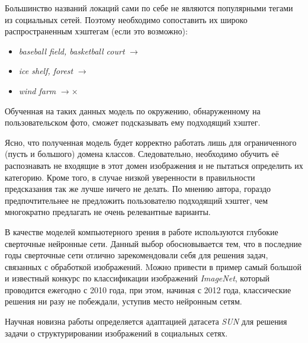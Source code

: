 \indent
Большинство названий локаций сами по себе не являются популярными 
тегами из социальных сетей. Поэтому необходимо
сопоставить их широко распространенным хэштегам (если это возможно):
  
  \begin{itemize}
      \item \textit{baseball field, basketball court}  $\rightarrow$ 
      \item \textit{ice shelf, forest} $\rightarrow$ 
      \item \textit{wind farm} $\rightarrow \times$ 
  \end{itemize}
  
\indent
Обученная на таких данных модель по окружению,
обнаруженному на пользовательском фото,
сможет подсказывать ему подходящий хэштег.



\indent
\indent
Ясно, что полученная модель будет корректно работать лишь для
ограниченного (пусть и большого) домена классов. Следовательно, необходимо 
обучить её распознавать не входящие в этот домен изображения и
не пытаться определить их категорию. Кроме того, в случае низкой уверенности
в правильности предсказания так же лучше ничего не делать. 
По мнению автора, гораздо предпочтительнее не 
предложить пользователю подходящий хэштег, чем многократно предлагать 
не очень релевантные варианты.
 
   
\indent
\indent
В качестве моделей компьютерного зрения в работе 
используются глубокие сверточные
нейронные сети. Данный выбор обосновывается тем, что в последние
годы сверточные сети отлично зарекомендовали себя для решения задач, связанных
с обработкой изображений. Mожно привести в пример самый большой 
и известный
конкурс по классификации изображений \textit{ImageNet}\cite{imagenet},
который проводится ежегодно с 2010 года, при этом, начиная с 2012 года, классические
решения ни разу не побеждали, уступив место нейронным сетям.


\indent
\indent
Научная новизна работы определяется адаптацией датасета \textit{SUN} для решения задачи о структурировании изображений в социальных сетях.
